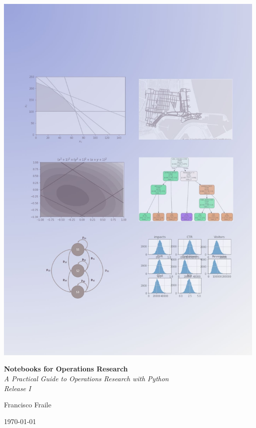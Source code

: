 \begin{titlepage}
    \centering
    \vspace*{-1cm}  %
    \includegraphics[width=\textwidth,height=\textheight,keepaspectratio]{cover.jpg}  %
    \vspace*{-2cm}  %

    {\Huge \textbf{Notebooks for Operations Research} \\[1em]}  %
    {\Large \textit{A Practical Guide to Operations Research with Python} \\[2em]}  %
    {\Large \textit{Release I} \\[1em]}  %


    {\Large Francisco Fraile \\[1em]}

    {\large \today}

    \vfill  %


\end{titlepage}
